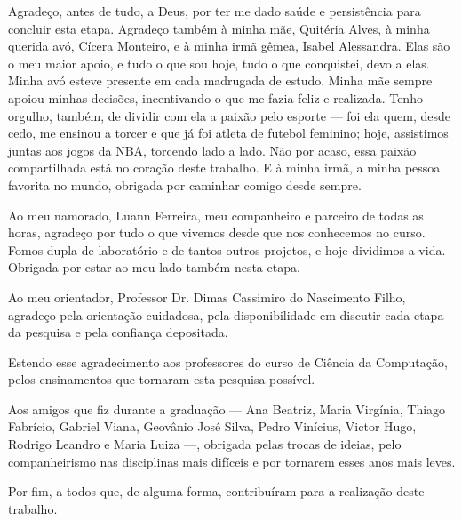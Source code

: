 Agradeço, antes de tudo, a Deus, por ter me dado saúde e persistência para concluir esta etapa. Agradeço também à minha mãe, Quitéria Alves, à minha querida avó, Cícera Monteiro, e à minha irmã gêmea, Isabel Alessandra. Elas são o meu maior apoio, e tudo o que sou hoje, tudo o que conquistei, devo a elas. Minha avó esteve presente em cada madrugada de estudo. Minha mãe sempre apoiou minhas decisões, incentivando o que me fazia feliz e realizada. Tenho orgulho, também, de dividir com ela a paixão pelo esporte — foi ela quem, desde cedo, me ensinou a torcer e que já foi atleta de futebol feminino; hoje, assistimos juntas aos jogos da NBA, torcendo lado a lado. Não por acaso, essa paixão compartilhada está no coração deste trabalho. E à minha irmã, a minha pessoa favorita no mundo, obrigada por caminhar comigo desde sempre.

Ao meu namorado, Luann Ferreira, meu companheiro e parceiro de todas as horas, agradeço por tudo o que vivemos desde que nos conhecemos no curso. Fomos dupla de laboratório e de tantos outros projetos, e hoje dividimos a vida. Obrigada por estar ao meu lado também nesta etapa.

Ao meu orientador, Professor Dr. Dimas Cassimiro do Nascimento Filho, agradeço pela orientação cuidadosa, pela disponibilidade em discutir cada etapa da pesquisa e pela confiança depositada.

Estendo esse agradecimento aos professores do curso de Ciência da Computação, pelos ensinamentos que tornaram esta pesquisa possível.

Aos amigos que fiz durante a graduação — Ana Beatriz, Maria Virgínia, Thiago Fabrício, Gabriel Viana, Geovânio José Silva, Pedro Vinícius, Victor Hugo, Rodrigo Leandro e Maria Luiza —, obrigada pelas trocas de ideias, pelo companheirismo nas disciplinas mais difíceis e por tornarem esses anos mais leves.

Por fim, a todos que, de alguma forma, contribuíram para a realização deste trabalho.
